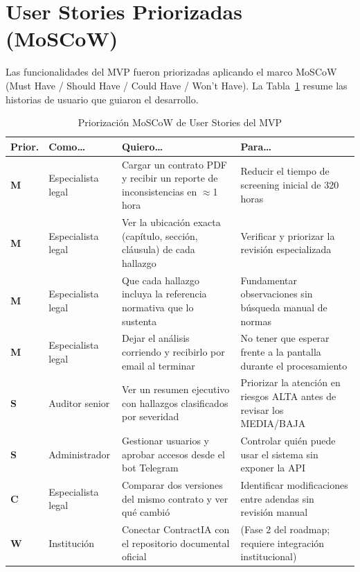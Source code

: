 \section{User Stories Priorizadas (MoSCoW)}

Las funcionalidades del MVP fueron priorizadas aplicando el marco MoSCoW
(Must Have / Should Have / Could Have / Won't Have). La Tabla~\ref{tab:moscow}
resume las historias de usuario que guiaron el desarrollo.

\begin{table}[H]
\centering
\caption{Priorización MoSCoW de User Stories del MVP}
\label{tab:moscow}
\begin{tabular}{p{0.8cm} p{4.5cm} p{3.5cm} p{4.5cm}}
\toprule
\textbf{Prior.} & \textbf{Como\ldots} & \textbf{Quiero\ldots} &
\textbf{Para\ldots} \\
\midrule
\textbf{M} & Especialista legal & Cargar un contrato PDF y recibir un
reporte de inconsistencias en $\approx$1 hora & Reducir el tiempo de
screening inicial de 320 horas \\[4pt]
\textbf{M} & Especialista legal & Ver la ubicación exacta (capítulo,
sección, cláusula) de cada hallazgo & Verificar y priorizar la revisión
especializada \\[4pt]
\textbf{M} & Especialista legal & Que cada hallazgo incluya la referencia
normativa que lo sustenta & Fundamentar observaciones sin búsqueda manual
de normas \\[4pt]
\textbf{M} & Especialista legal & Dejar el análisis corriendo y recibirlo
por email al terminar & No tener que esperar frente a la pantalla durante
el procesamiento \\[4pt]
\textbf{S} & Auditor senior & Ver un resumen ejecutivo con hallazgos
clasificados por severidad & Priorizar la atención en riesgos ALTA antes
de revisar los MEDIA/BAJA \\[4pt]
\textbf{S} & Administrador & Gestionar usuarios y aprobar accesos desde
el bot Telegram & Controlar quién puede usar el sistema sin exponer la API \\[4pt]
\textbf{C} & Especialista legal & Comparar dos versiones del mismo contrato
y ver qué cambió & Identificar modificaciones entre adendas sin revisión
manual \\[4pt]
\textbf{W} & Institución & Conectar ContractIA con el repositorio
documental oficial & (Fase 2 del roadmap; requiere integración
institucional) \\
\bottomrule
\end{tabular}
\end{table}

